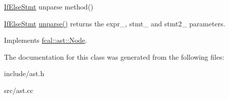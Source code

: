 \hyperlink{classfcal_1_1ast_1_1IfElseStmt}{If\+Else\+Stmt} unparse method() 

\hyperlink{classfcal_1_1ast_1_1IfElseStmt}{If\+Else\+Stmt} \hyperlink{classfcal_1_1ast_1_1IfElseStmt_a58584903e7e9480773ca5be804342721}{unparse()} returns the expr\+\_\+, stmt\+\_\+ and stmt2\+\_\+ parameters. 

Implements \hyperlink{classfcal_1_1ast_1_1Node_a81865f5a1df593708a39bf492952742a}{fcal\+::ast\+::\+Node}.



The documentation for this class was generated from the following files\+:\begin{DoxyCompactItemize}
\item 
include/ast.\+h\item 
src/ast.\+cc\end{DoxyCompactItemize}
